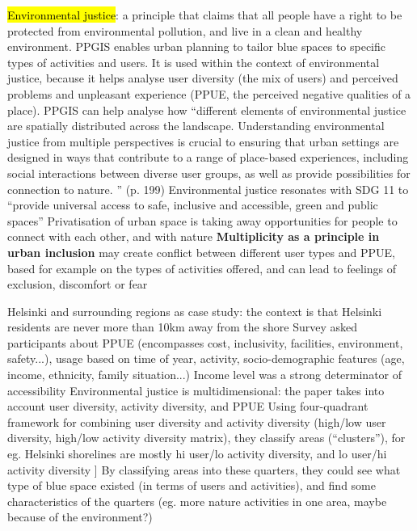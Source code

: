\documentclass{article}
\newcommand{\alignedmarginpar}[1]{%
        \marginpar{\raggedright\small #1}
    }
\begin{document}
\begin{outline}
	\1 \hl{Environmental justice}: a principle that claims that all people have a right to be protected from environmental pollution, and live in a clean and healthy environment. 
		\2  PPGIS enables urban planning to tailor blue spaces to specific types of activities and users. It is used within the context of environmental justice, because it helps analyse user diversity (the mix of users) and perceived problems and unpleasant experience (PPUE, the perceived negative qualities of a place). PPGIS can help analyse how ``different elements of environmental justice are spatially distributed across the landscape. Understanding environmental justice from multiple perspectives is crucial to ensuring that urban settings are designed in ways that contribute to a range of place-based experiences, including social interactions between diverse user groups, as well as provide possibilities for connection to nature. '' (p. 199)
		\2 Environmental justice resonates with SDG 11 to ``provide universal access to safe, inclusive and accessible, green and public spaces''
		\2 Privatisation of urban space is taking away opportunities for people to connect with each other, and with nature
		\2 \textbf{Multiplicity as a principle in urban inclusion} may create conflict between different user types and PPUE, based for example on the types of activities offered, and can lead to feelings of exclusion, discomfort or fear\alignedmarginpar{Inclusivity in public space\\Right to blue space}
	\1 Helsinki and surrounding regions as case study: the context is that Helsinki residents are never more than 10km away from the shore
		\2 Survey asked participants about PPUE (encompasses cost, inclusivity, facilities, environment, safety...), usage based on time of year, activity, socio-demographic features (age, income, ethnicity, family situation...)
		\2 Income level was a strong determinator of accessibility
	\1 Environmental justice is multidimensional: the paper takes into account user diversity, activity diversity, and PPUE
		\2 Using four-quadrant framework for combining user diversity and activity diversity (high/low user diversity, high/low activity diversity matrix), they classify areas (``clusters''), for eg. Helsinki shorelines are mostly hi user/lo activity diversity, and lo user/hi activity diversity ]
		\2 By classifying areas into these quarters, they could see what type of blue space existed (in terms of users and activities), and find some characteristics of the quarters (eg. more nature activities in one area, maybe because of the environment?)

\end{outline}
\end{document}
